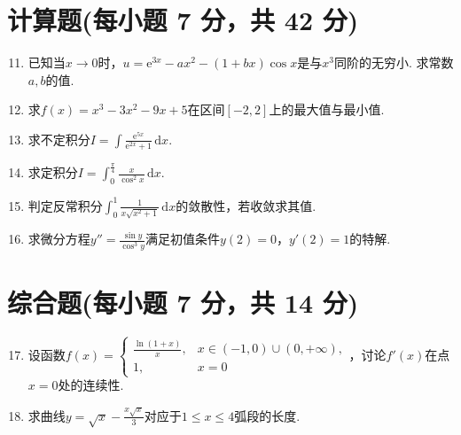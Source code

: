 \documentclass[../main.tex]{subfiles}
\begin{document}
\section{计算题(每小题 7 分，共 42 分)}
\begin{enumerate}
    \setcounter{enumi}{10}
    \item 已知当$x\to0$时，$u=\mathrm{e}^{3x}-ax^{2}-(1+bx)\cos x$是与$x^{3}$同阶的无穷小.
          求常数$a,b$的值.
          \vspace{12em}

    \item 求$f(x)=x^{3}-3x^{2}-9x+5$在区间$[-2,2]$上的最大值与最小值.
          \vspace{12em}

    \item 求不定积分$I=\int \frac{\mathrm{e}^{5x}}{\mathrm{e}^{2x}+1}\,\mathrm{d}
              x$.
          \vspace{11em}

    \item 求定积分$I=\int_{0}^{\frac{\pi}{4}}\frac{x}{\cos^{2} x}\,\mathrm{d}x$.
          \vspace{11em}

    \item 判定反常积分$\int_{0}^{1}\frac{1}{x\sqrt{x^{2}+1}}\,\mathrm{d}x$的敛散性，若收敛求其值.
          \vspace{12em}

    \item 求微分方程$y''=\frac{\sin y}{\cos^{3} y}$满足初值条件$y(2)=0$，$y'
              (2)=1$的特解.
          \vspace{12em}
\end{enumerate}

\section{综合题(每小题 7 分，共 14 分)}
\begin{enumerate}
    \setcounter{enumi}{16}
    \item 设函数$f(x)=
              \begin{cases}
                  \frac{\ln(1+x)}{x} , & x\in(-1,0)\cup(0,+\infty), \\
                  1,                   & x=0
              \end{cases}$，讨论$f'(x)$在点$x=0$处的连续性.
          \vspace{12em}

    \item 求曲线$y=\sqrt{x}-\frac{x\sqrt{x}}{3}$对应于$1\leq x\leq 4$弧段的长度.
          \vspace{15em}
\end{enumerate}
\end{document}
